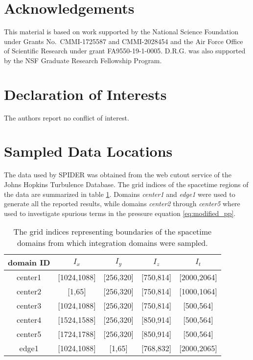 \documentclass[preprint]{article}
\begin{document}
\section*{Acknowledgements}
This material is based on work supported by the National Science Foundation under Grants No.~CMMI-1725587 and CMMI-2028454 and the Air Force Office of Scientific Research under grant FA9550-19-1-0005. D.R.G. was also supported by the NSF Graduate Research Fellowship Program.

\section*{Declaration of Interests}
The authors report no conflict of interest.





\appendix

\section{Sampled Data Locations}
The data used by SPIDER was obtained from the web cutout service of the Johns Hopkins Turbulence Database. The grid indices of the spacetime regions of the data are summarized in table \ref{tab:locations}.
Domains {\em center1} and {\em edge1} were used to generate all the reported results, while domains {\em center2} through  {\em center5} where used to investigate spurious terms in the pressure equation \eqref{eq:modified_pp}.

\begin{table}[]
    \centering
    \begin{tabular}{|c|c|c|c|c|}
    \hline
        domain ID & $I_x$ & $I_y$ & $I_z$ & $I_t$ \\
        \hline
        center1 & [1024,1088] & [256,320] & [750,814] & [2000,2064] \\
        center2 & [1,65] & [256,320] & [750,814] & [1000,1064] \\
        center3 & [1024,1088] & [256,320] & [750,814] & [500,564] \\
        center4 & [1524,1588] & [256,320] & [850,914] & [500,564] \\
        center5 & [1724,1788] & [256,320] & [850,914] & [500,564] \\
        edge1   & [1024,1088] & [1,65] & [768,832] & [2000,2065] \\
        \hline
    \end{tabular}
    \caption{The grid indices representing boundaries of the spacetime domains from which integration domains were sampled.}
    \label{tab:locations}
\end{table}
\end{document}
